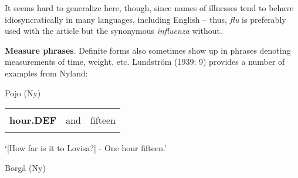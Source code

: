 \begin{styleBodyTextFirst}
It seems hard to generalize here, though, since names of illnesses tend to behave idiosyncratically in many languages, including English – thus, \textit{flu} is preferably used with the article but the synonymous \textit{influenza} without.

\end{styleBodyTextFirst}

\begin{styleBodytextC}
\textbf{Measure phrases}. Definite forms also sometimes show up in phrases denoting measurements of time, weight, etc. Lundström (1939: 9) provides a number of examples from Nyland: 

\end{styleBodytextC}

\begin{listWWNumileveli}
\item 

\end{listWWNumileveli}

\begin{listWWNumlileveli}
\item 

\begin{styleExLtrTbl}
Pojo (Ny)

\end{styleExLtrTbl}

\end{listWWNumlileveli}

\begin{styleExampleC}

\end{styleExampleC}

\begin{tabular}{lll}
\lsptoprule
\multicolumn{3}{l}{{\bfseries Timmen}

}\\
{\bfseries hour.DEF} & and & fifteen\\
\lspbottomrule
\end{tabular}

\begin{styleTranslation}
‘[How far is it to Lovisa?] - One hour fifteen.’

\end{styleTranslation}

\begin{styleExLtrTblii}
Borgå (Ny)

\end{styleExLtrTblii}

